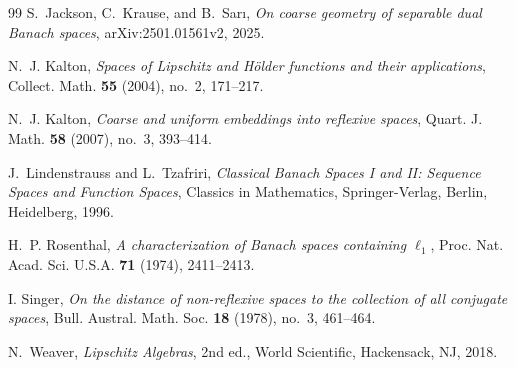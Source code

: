 \documentclass[11pt]{amsart}
\theoremstyle{definition}
\begin{document}
\begin{thebibliography}{99}
S.~Jackson, C.~Krause, and B.~Sar\i{},
{\em On coarse geometry of separable dual Banach spaces},
arXiv:2501.01561v2, 2025.

N.~J. Kalton,
\emph{Spaces of Lipschitz and H\"older functions and their applications},
Collect. Math. \textbf{55} (2004), no.~2, 171--217.

N.~J. Kalton,
{\em Coarse and uniform embeddings into reflexive spaces},
Quart. J. Math. \textbf{58} (2007), no.~3, 393--414.

 J.~Lindenstrauss and L.~Tzafriri, 
\emph{Classical Banach Spaces I and II: Sequence Spaces and Function Spaces}, 
Classics in Mathematics, 
Springer-Verlag, Berlin, Heidelberg, 1996.

H.~P. Rosenthal,
{\em A characterization of Banach spaces containing $\ell_1$},
Proc. Nat. Acad. Sci. U.S.A. \textbf{71} (1974), 2411--2413.

I. Singer,
\emph{On the distance of non-reflexive spaces to the collection of all
conjugate spaces},
Bull. Austral. Math. Soc. \textbf{18} (1978), no.~3, 461--464.


N.~Weaver,
{\em Lipschitz Algebras}, 2nd ed.,
World Scientific, Hackensack, NJ, 2018.







\end{thebibliography}
\end{document}
